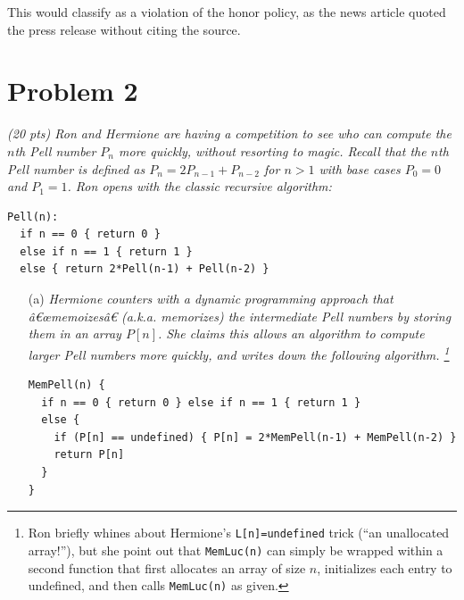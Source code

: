 \documentclass[11pt]{article} \setlength{\oddsidemargin}{0in}
\begin{document}
{\begin{enumerate}
    This would classify as a violation of the honor policy, as the news article quoted the press release without citing the source. 

  \end{enumerate}

  \newpage

  \section*{Problem 2}

  \textit{(20 pts) Ron and Hermione are having a competition to see
    who can compute the $n$th Pell number $P_n$ more quickly, without
    resorting to magic. Recall that the $n$th Pell number is defined
    as $P_n = 2 P_{n-1} + P_{n-2}$ for $n > 1$ with base cases
    $P_0 = 0$ and $P_1 = 1$.  Ron opens with the classic recursive
    algorithm:}

\begin{verbatim}
Pell(n):
  if n == 0 { return 0 }
  else if n == 1 { return 1 }
  else { return 2*Pell(n-1) + Pell(n-2) }
\end{verbatim}

  \begin{enumerate}
  \item[(a)]{\textit{Hermione counters with a dynamic programming
        approach that â€œmemoizesâ€ (a.k.a.  memorizes) the intermediate
        Pell numbers by storing them in an array $P[n]$. She claims
        this allows an algorithm to compute larger Pell numbers more
        quickly, and writes down the following
        algorithm. \footnote{Ron briefly whines about Hermione's
          \texttt{L[n]=undefined} trick (``an unallocated array!''),
          but she point out that \texttt{MemLuc(n)} can simply be
          wrapped within a second function that first allocates an
          array of size $n$, initializes each entry to undefined, and
          then calls \texttt{MemLuc(n)} as given.}}}

\begin{verbatim}
MemPell(n) {
  if n == 0 { return 0 } else if n == 1 { return 1 }
  else {
    if (P[n] == undefined) { P[n] = 2*MemPell(n-1) + MemPell(n-2) }
    return P[n]
  }
}
\end{verbatim}


\end{enumerate}}
\end{document}
